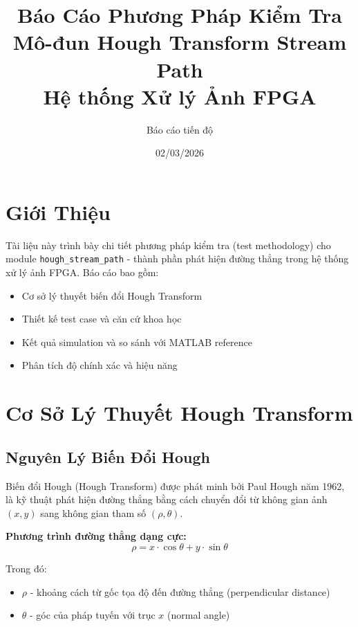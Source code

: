 \documentclass[12pt,a4paper]{article}
\title{\textbf{Báo Cáo Phương Pháp Kiểm Tra}\\
\Large Mô-đun Hough Transform Stream Path\\
\large Hệ thống Xử lý Ảnh FPGA}
\author{Báo cáo tiến độ}
\date{02/03/2026}
\begin{document}
\maketitle

\tableofcontents
\newpage

\section{Giới Thiệu}

Tài liệu này trình bày chi tiết phương pháp kiểm tra (test methodology) cho module \texttt{hough\_stream\_path} - thành phần phát hiện đường thẳng trong hệ thống xử lý ảnh FPGA. Báo cáo bao gồm:

\begin{itemize}
    \item Cơ sở lý thuyết biến đổi Hough Transform
    \item Thiết kế test case và căn cứ khoa học
    \item Kết quả simulation và so sánh với MATLAB reference
    \item Phân tích độ chính xác và hiệu năng
\end{itemize}

\section{Cơ Sở Lý Thuyết Hough Transform}

\subsection{Nguyên Lý Biến Đổi Hough}

Biến đổi Hough (Hough Transform) được phát minh bởi Paul Hough năm 1962, là kỹ thuật phát hiện đường thẳng bằng cách chuyển đổi từ không gian ảnh $(x, y)$ sang không gian tham số $(\rho, \theta)$.

\textbf{Phương trình đường thẳng dạng cực:}
\begin{equation}
    \rho = x \cdot \cos\theta + y \cdot \sin\theta
    \label{eq:hough}
\end{equation}

Trong đó:
\begin{itemize}
    \item $\rho$ - khoảng cách từ gốc tọa độ đến đường thẳng (perpendicular distance)
    \item $\theta$ - góc của pháp tuyến với trục $x$ (normal angle)
\end{itemize}
\end{document}
